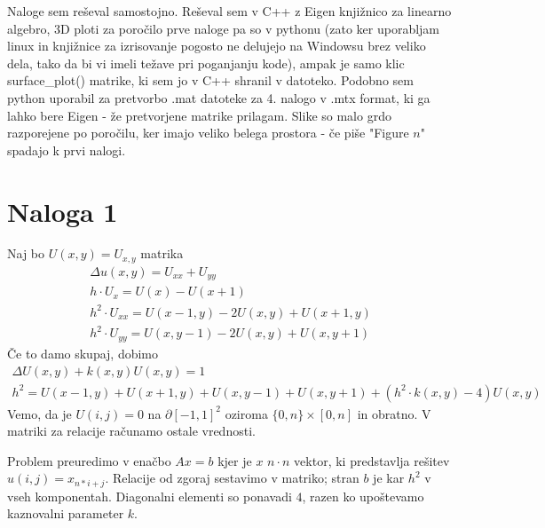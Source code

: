 \documentclass{article}
\begin{document}
Naloge sem reševal samostojno. Reševal sem v C++ z Eigen knjižnico za linearno algebro, 3D ploti za poročilo prve naloge pa so v pythonu (zato ker uporabljam linux in knjižnice za izrisovanje pogosto ne delujejo na Windowsu brez veliko dela, tako da bi vi imeli težave pri poganjanju kode), ampak je samo klic surface\_plot() matrike, ki sem jo v C++ shranil v datoteko. Podobno sem python uporabil za pretvorbo .mat datoteke za 4. nalogo v .mtx format, ki ga lahko bere Eigen - že pretvorjene matrike prilagam. Slike so malo grdo razporejene po poročilu, ker imajo veliko belega prostora - če piše "Figure \(n\)" spadajo k prvi nalogi.

\section{Naloga 1}
    Naj bo \(U(x,y) = U_{x,y}\) matrika
    \begin{align*}
        \Delta u(x,y) = U_{xx} + U_{yy}\\
        h\cdot U_x = U(x) - U(x+1)\\
        h^2\cdot U_{xx} = U(x-1, y) - 2U(x,y) + U(x+1,y)\\
        h^2\cdot U_{yy} = U(x, y-1) - 2U(x,y) + U(x, y+1)
    \end{align*}
    Če to damo skupaj, dobimo
    \begin{align*}
        \Delta U(x,y) + k(x,y)U(x,y) = 1\\
        h^2 = U(x-1,y)+U(x+1,y)+U(x,y-1)+U(x,y+1) + (h^2\cdot k(x,y)- 4) U(x,y)
    \end{align*}
    Vemo, da je \(U(i,j)=0\) na \(\partial [-1,1]^2\) oziroma \(\{0,n\}\times [0,n]\) in obratno. V matriki za relacije računamo ostale vrednosti.
    
    Problem preuredimo v enačbo \(Ax=b\) kjer je \(x\) \(n\cdot n\) vektor, ki predstavlja rešitev \(u(i,j) = x_{n*i+j}\). Relacije od zgoraj sestavimo v matriko; stran \(b\) je kar \(h^2\) v vseh komponentah. Diagonalni elementi so ponavadi \(4\), razen ko upoštevamo kaznovalni parameter \(k\).
\end{document}
